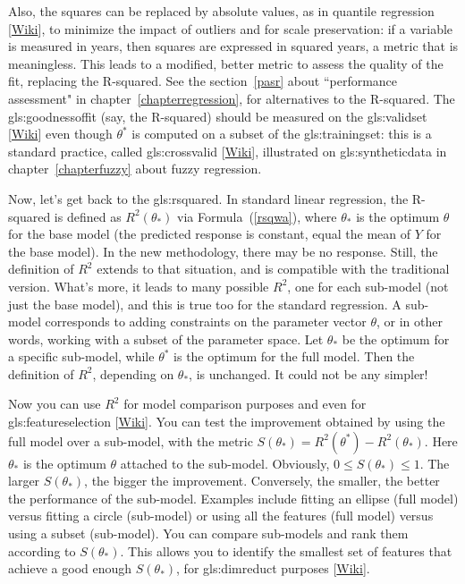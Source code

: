 \documentclass[oneside,10pt]{book}
\begin{document}
Also, the squares
 can be replaced by absolute values, as in \textcolor{index}{quantile regression} [\href{https://en.wikipedia.org/wiki/Quantile_regression}{Wiki}], to minimize the impact of outliers and for scale preservation: if a variable is measured in years, then squares are expressed in squared years, a metric that is meaningless. This leads to a modified, better metric to assess the quality of the fit, replacing the R-squared.  See the section~\ref{pasr} about ``performance
 assessment" in chapter~\ref{chapterregression}, for alternatives to the R-squared.
The \gls{gls:goodnessoffit} (say, the R-squared) should be measured on the \gls{gls:validset}
 [\href{https://en.wikipedia.org/wiki/Training,_validation,_and_test_data_sets}{Wiki}] even though $\theta^*$ is computed on a subset of the \gls{gls:trainingset}: this is a standard practice, called \gls{gls:crossvalid} [\href{https://en.wikipedia.org/wiki/Cross-validation_(statistics)}{Wiki}],
 illustrated on \gls{gls:syntheticdata} in chapter~\ref{chapterfuzzy} about fuzzy regression.

Now, let's get back to the
\gls{gls:rsquared}. In standard linear regression, the R-squared is defined as $R^2(\theta_*)$ via
 Formula~(\ref{rsqwa}), where
 $\theta_*$ is the optimum $\theta$ for the base model (the predicted response is constant, equal the mean of $Y$ for the base model). In the
 new methodology, there may be no response. Still, the definition of $R^2$ extends to that situation, and is compatible with the traditional version.
 What's more, it leads to many possible $R^2$, one for each sub-model (not just the base model), and this is true too for the standard regression.
A sub-model corresponds to adding constraints on the parameter vector $\theta$, or in other words, working with a subset of the parameter space. Let $\theta_*$ be the optimum for a specific sub-model, while $\theta^*$ is the optimum for the full model. Then the definition of $R^2$, depending on $\theta_*$, is unchanged. It could not be any simpler!

Now you can use $R^2$ for model comparison purposes and even for \gls{gls:featureselection} [\href{https://en.wikipedia.org/wiki/Feature_selection}{Wiki}]. You can test the improvement obtained by using the full model over a sub-model,
 with the metric $S(\theta_*)= R^2(\theta^*)-R^2(\theta_*)$. Here $\theta_*$ is the optimum $\theta$ attached to the sub-model. Obviously, $0\leq S(\theta_*)\leq 1$. The larger $S(\theta_*)$, the bigger the improvement. Conversely, the smaller, the better the performance of the sub-model. Examples include fitting an ellipse (full model) versus fitting a circle (sub-model) or using all the features (full model) versus using a subset (sub-model).
You can compare sub-models and rank them according to $S(\theta_*)$. This allows you to identify the smallest set of features that achieve a good
 enough $S(\theta_*)$, for
\gls{gls:dimreduct}
 purposes [\href{https://en.wikipedia.org/wiki/Dimensionality_reduction}{Wiki}].
\end{document}
